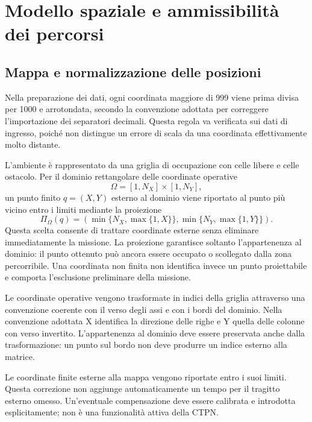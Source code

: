 \newpage
\section{Modello spaziale e ammissibilità dei percorsi}
\label{sec:progetto-spazio}

\subsection{Mappa e normalizzazione delle posizioni}

Nella preparazione dei dati, ogni coordinata maggiore di 999 viene prima
divisa per 1000 e arrotondata, secondo la convenzione adottata per correggere
l'importazione dei separatori decimali. Questa regola va verificata sui dati
di ingresso, poiché non distingue un errore di scala da una coordinata
effettivamente molto distante.

L'ambiente è rappresentato da una griglia di occupazione con celle libere e
celle ostacolo. Per il dominio rettangolare delle coordinate operative
\begin{equation}
    \Omega=[1,N_X]\times[1,N_Y],
\end{equation}
un punto finito $q=(X,Y)$ esterno al dominio viene riportato al punto più
vicino entro i limiti mediante la proiezione
\begin{equation}
    \Pi_\Omega(q)=
    \left(\min\{N_X,\max\{1,X\}\},
          \min\{N_Y,\max\{1,Y\}\}\right).
\end{equation}
Questa scelta consente di trattare coordinate esterne senza eliminare
immediatamente la missione. La proiezione garantisce soltanto l'appartenenza
al dominio: il punto ottenuto può ancora essere occupato o scollegato dalla
zona percorribile. Una coordinata non finita non identifica invece un punto
proiettabile e comporta l'esclusione preliminare della missione.

Le coordinate operative vengono trasformate in indici della griglia attraverso
una convenzione coerente con il verso degli assi e con i bordi del dominio.
Nella convenzione adottata X identifica la direzione delle righe e Y quella
delle colonne con verso invertito. L'appartenenza al dominio deve essere
preservata anche dalla trasformazione: un punto sul bordo non deve produrre
un indice esterno alla matrice.


\begin{nota}
	Le coordinate finite esterne alla mappa vengono riportate entro i suoi
	limiti. Questa correzione non aggiunge automaticamente un tempo per il
	tragitto esterno omesso. Un'eventuale compensazione deve essere calibrata
	e introdotta esplicitamente; non è una funzionalità attiva della CTPN.
\end{nota}

